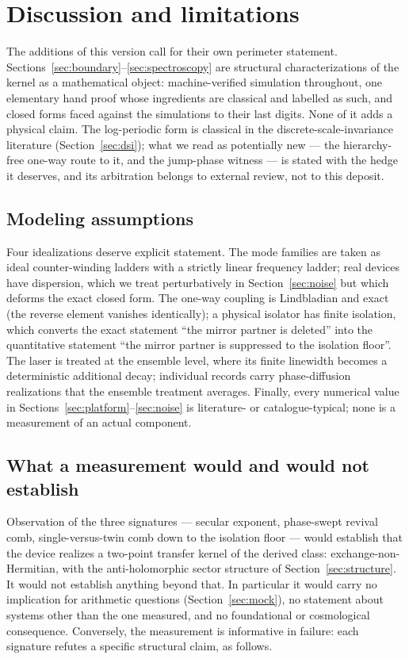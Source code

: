 \documentclass[11pt,a4paper]{article}
\begin{document}
\section{Discussion and limitations}
\label{sec:discussion}

The additions of this version call for their own perimeter statement.
Sections~\ref{sec:boundary}--\ref{sec:spectroscopy} are structural
characterizations of the kernel as a mathematical object: machine-verified
simulation throughout, one elementary hand proof whose ingredients are
classical and labelled as such, and closed forms faced against the
simulations to their last digits. None of it adds a physical claim. The
log-periodic form is classical in the discrete-scale-invariance literature
(Section~\ref{sec:dsi}); what we read as potentially new --- the
hierarchy-free one-way route to it, and the jump-phase witness --- is
stated with the hedge it deserves, and its arbitration belongs to external
review, not to this deposit.

\subsection{Modeling assumptions}

Four idealizations deserve explicit statement. The mode families are taken as
ideal counter-winding ladders with a strictly linear frequency ladder; real
devices have dispersion, which we treat perturbatively in
Section~\ref{sec:noise} but which deforms the exact closed form. The one-way
coupling is Lindbladian and exact (the reverse element vanishes identically); a
physical isolator has finite isolation, which converts the exact statement
``the mirror partner is deleted'' into the quantitative statement ``the mirror
partner is suppressed to the isolation floor''. The laser is treated at the
ensemble level, where its finite linewidth becomes a deterministic additional
decay; individual records carry phase-diffusion realizations that the ensemble
treatment averages. Finally, every numerical value in
Sections~\ref{sec:platform}--\ref{sec:noise} is literature- or
catalogue-typical; none is a measurement of an actual component.

\subsection{What a measurement would and would not establish}

Observation of the three signatures --- secular exponent, phase-swept revival
comb, single-versus-twin comb down to the isolation floor --- would establish
that the device realizes a two-point transfer kernel of the derived class:
exchange-non-Hermitian, with the anti-holomorphic sector structure of
Section~\ref{sec:structure}. It would not establish anything beyond that. In
particular it would carry no implication for arithmetic questions
(Section~\ref{sec:mock}), no statement about systems other than the one
measured, and no foundational or cosmological consequence. Conversely, the
measurement is informative in failure: each signature refutes a specific
structural claim, as follows.
\end{document}
